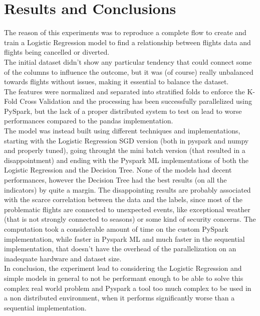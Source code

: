 \documentclass[
	letterpaper, %
	10pt, %
]{class}
\begin{document}

\section{Results and Conclusions}

The reason of this experiments was to reproduce a complete flow to create and train a Logistic Regression model to find a relationship between flights data and flights being cancelled or diverted.\\
The initial dataset didn't show any particular tendency that could connect some of the columns to influence the outcome, but it was (of course) really unbalanced towards flights without issues, making it essential to balance the dataset.\\
The features were normalized and separated into stratified folds to enforce the K-Fold Cross Validation and the processing has been successfully parallelized using PySpark, but the lack of a proper distributed system to test on lead to worse performances compared to the pandas implementation.\\

The model was instead built using different techniques and implementations, starting with the Logistic Regression SGD version (both in pyspark and numpy and properly tuned), going throught the mini batch version (that resulted in a disappointment) and ending with the Pyspark ML implementations of both the Logistic Regression and the Decision Tree.
None of the models had decent performances, however the Decision Tree had the best results (on all the indicators) by quite a margin. The disappointing results are probably associated with the scarce correlation between the data and the labels, since most of the problematic flights are connected to unexpected events, like exceptional weather (that is not strongly connected to seasons) or some kind of security concerns.
The computation took a considerable amount of time on the custom PySpark implementation, while faster in Pyspark ML and much faster in the sequential implementation, that doesn't have the overhead of the parallelization on an inadequate hardware and dataset size.\\

In conclusion, the experiment lead to considering the Logistic Regression and simple models in general to not be performant enough to be able to solve this complex real world problem and Pyspark a tool too much complex to be used in a non distributed environment, when it performs significantly worse than a sequential implementation.


\printbibliography %

\end{document}
